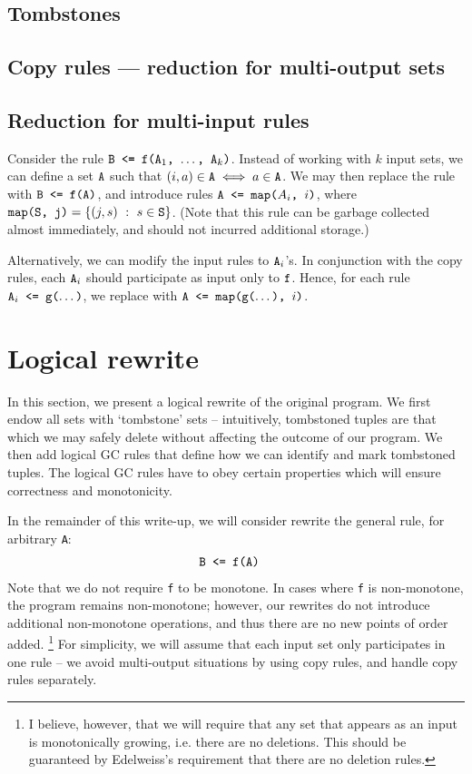 \documentclass[10pt]{proc}
\numberwithin{equation}{section}
\renewcommand{\tt}[1]{\ifmmode\text{\texttt{#1}}\else\texttt{#1}\fi}
\begin{document}
\subsection{Tombstones}
\subsection{Copy rules --- reduction for multi-output sets}
\subsection{Reduction for multi-input rules}
Consider the rule $\tt{B <= f(A$_1$, $\dots$, A$_k$)}$.
Instead of working with $k$ input sets, we can define a set $\tt{A}$ such that $(i, a) \in \tt{A} \iff a \in \tt{A}$.
We may then replace the rule with $\tt{B <= f(A)}$, and introduce rules $\tt{A <= map($A_i$, $i$)}$, where $\tt{map(S, j)} = \{(j, s) ~:~ s\in \tt{S}\}$.
(Note that this rule can be garbage collected almost immediately, and should not incurred additional storage.)

Alternatively, we can modify the input rules to $\tt{A}_i$'s.
In conjunction with the copy rules, each $\tt{A}_i$ should participate as input only to $\tt{f}$.
Hence, for each rule $\tt{A}_i \tt{ <= } \tt{g($\dots$)}$, we replace with $\tt{A} \tt{ <= } \tt{map(g($\dots$), $i$)}$.


\section{Logical rewrite}
In this section, we present a logical rewrite of the original program.
We first endow all sets with `tombstone' sets -- intuitively, tombstoned tuples are that which we may safely delete without affecting the outcome of our program.
We then add logical GC rules that define how we can identify and mark tombstoned tuples.
The logical GC rules have to obey certain properties which will ensure correctness and monotonicity.

In the remainder of this write-up, we will consider rewrite the general rule, for arbitrary \tt{A}:
\begin{align}
\tt{B} &\tt{ <= f(A)}
\end{align}
Note that we do not require \tt{f} to be monotone.
In cases where \tt{f} is non-monotone, the program remains non-monotone; however, our rewrites do not introduce additional non-monotone operations, and thus there are no new points of order added.
\footnote{I believe, however, that we will require that any set that appears as an input is monotonically growing, i.e. there are no deletions. This should be guaranteed by Edelweiss's requirement that there are no deletion rules.}
For simplicity, we will assume that each input set only participates in one rule -- we avoid multi-output situations by using copy rules, and handle copy rules separately.
\end{document}
